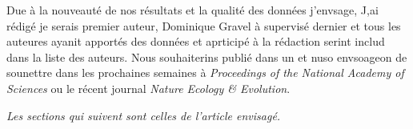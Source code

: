 Due à la nouveauté de nos résultats et la qualité des données j'envsage, J,ai rédigé je serais premier auteur, Dominique Gravel à supervisé dernier et tous les auteures ayanit apportés des données et aprticipé à la rédaction serint includ dans la liste des auteurs. Nous souhaiterins publié dans un et nuso envsoageon de sounettre dans les prochaines semaines à \emph{Proceedings of the National Academy of Sciences} ou le récent journal \emph{Nature Ecology \& Evolution}.



\emph{Les sections qui suivent sont celles de l'article envisagé.}


\newpage
